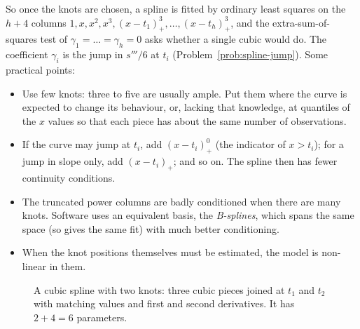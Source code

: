 \documentclass[11pt,a4paper]{article}
\numberwithin{equation}{section}
\theoremstyle{definition}
\begin{document}
So once the knots are chosen, a spline is fitted by ordinary least squares on the $h + 4$ columns
$1, x, x^2, x^3, (x - t_1)_+^3, \dots, (x - t_h)_+^3$, and the extra-sum-of-squares test of $\gamma_1 = \dots = \gamma_h = 0$ asks whether a
single cubic would do. The coefficient $\gamma_i$ is the jump in $s'''/6$ at $t_i$ (Problem~\ref{prob:spline-jump}). Some
practical points:
\begin{itemize}
\item Use few knots: three to five are usually ample. Put them where the curve is expected to change its
behaviour, or, lacking that knowledge, at quantiles of the $x$ values so that each piece has about the same
number of observations.
\item If the curve may jump at $t_i$, add $(x - t_i)_+^0$ (the indicator of $x > t_i$); for a jump in slope only, add $(x - t_i)_+$; and so
on. The spline then has fewer continuity conditions.
\item The truncated power columns are badly conditioned when there are many knots. Software uses an
equivalent basis, the \emph{B-splines}, which spans the same space (so gives the same fit) with much better
conditioning.
\item When the knot positions themselves must be estimated, the model is non-linear in them.
\end{itemize}

\begin{figure}[H]
\centering
{}
\caption{A cubic spline with two knots: three cubic pieces joined at $t_1$ and $t_2$ with matching values and
first and second derivatives. It has $2 + 4 = 6$ parameters.}
\label{fig:spline}
\end{figure}
\end{document}
